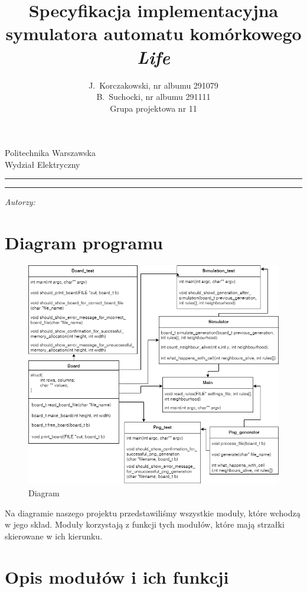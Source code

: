 \documentclass[a4paper,11pt, notitlepage ]{article}
\author{J.~Korczakowski, nr albumu 291079\\ B.~Suchocki, nr albumu 291111\\ Grupa projektowa nr 11}
\title{Specyfikacja implementacyjna symulatora automatu komórkowego \textsl{Life}}
\makeatletter
\newcommand{\linia}{\rule{\linewidth}{0.4mm}}
\renewcommand{\maketitle}{\begin{titlepage}
    \vspace*{1cm}
    \begin{center}\small
    Politechnika Warszawska\\
    Wydział Elektryczny
    \end{center}
    \vspace{3cm}
    \noindent\linia
    \begin{center}
      \LARGE \textsc{\@title}
         \end{center}
     \linia
    \vspace{0.5cm}
    \begin{flushright}
    \begin{minipage}{8cm}
    \textit{\small Autorzy:}\\
    \normalsize \textsc{\@author} \par
    \end{minipage}
    \end{flushright}
    \vspace*{\stretch{6}}
    \begin{center}
    \@date
    \end{center}
  \end{titlepage}%
}
\makeatother
\begin{document}
\maketitle
\setcounter{page}{2}
\tableofcontents
\newpage
\section{Diagram programu}
\begin{figure}[h]
\centering
\includegraphics[width=13cm]{Modules_diagram}
\caption{Diagram}
\end{figure}

Na diagramie naszego projektu przedstawiliśmy wszystkie moduły, które wchodzą w jego skład. Moduły korzystają z funkcji tych modułów, które mają strzałki skierowane w ich kierunku.
\section{Opis modułów i ich funkcji}\label{Opis}
\end{document}

